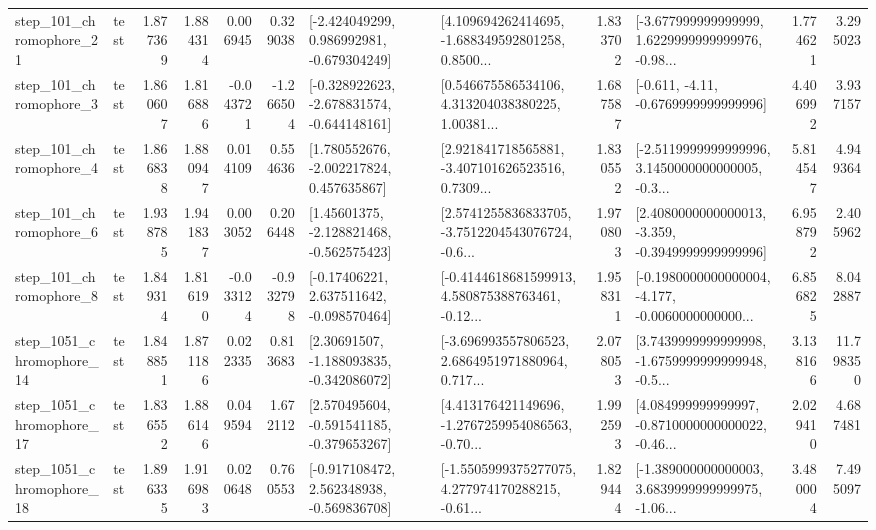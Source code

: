 \begin{tabular}{llrrrrllrlrr}
  step\_101\_chromophore\_21 &      test &      1.877369 &    1.884314 &      0.006945 &  0.329038 &   [-2.424049299, 0.986992981, -0.679304249] &  [4.109694262414695, -1.688349592801258, 0.8500... &       1.833702 &  [-3.677999999999999, 1.6229999999999976, -0.98... &            1.774621 &          3.295023 \\
   step\_101\_chromophore\_3 &      test &      1.860607 &    1.816886 &     -0.043721 & -1.266504 &  [-0.328922623, -2.678831574, -0.644148161] &  [0.546675586534106, 4.313204038380225, 1.00381... &       1.687587 &               [-0.611, -4.11, -0.6769999999999996] &            4.406992 &          3.937157 \\
   step\_101\_chromophore\_4 &      test &      1.866838 &    1.880947 &      0.014109 &  0.554636 &    [1.780552676, -2.002217824, 0.457635867] &  [2.921841718565881, -3.407101626523516, 0.7309... &       1.830552 &  [-2.5119999999999996, 3.1450000000000005, -0.3... &            5.814547 &          4.949364 \\
   step\_101\_chromophore\_6 &      test &      1.938785 &    1.941837 &      0.003052 &  0.206448 &    [1.45601375, -2.128821468, -0.562575423] &  [2.5741255836833705, -3.7512204543076724, -0.6... &       1.970803 &  [2.4080000000000013, -3.359, -0.3949999999999996] &            6.958792 &          2.405962 \\
   step\_101\_chromophore\_8 &      test &      1.849314 &    1.816190 &     -0.033124 & -0.932798 &    [-0.17406221, 2.637511642, -0.098570464] &  [-0.4144618681599913, 4.580875388763461, -0.12... &       1.958311 &  [-0.1980000000000004, -4.177, -0.0060000000000... &            6.856825 &          8.042887 \\
 step\_1051\_chromophore\_14 &      test &      1.848851 &    1.871186 &      0.022335 &  0.813683 &    [2.30691507, -1.188093835, -0.342086072] &  [-3.696993557806523, 2.6864951971880964, 0.717... &       2.078053 &  [3.7439999999999998, -1.6759999999999948, -0.5... &            3.138166 &         11.798350 \\
 step\_1051\_chromophore\_17 &      test &      1.836552 &    1.886146 &      0.049594 &  1.672112 &   [2.570495604, -0.591541185, -0.379653267] &  [4.413176421149696, -1.2767259954086563, -0.70... &       1.992593 &  [4.084999999999997, -0.8710000000000022, -0.46... &            2.029410 &          4.687481 \\
 step\_1051\_chromophore\_18 &      test &      1.896335 &    1.916983 &      0.020648 &  0.760553 &   [-0.917108472, 2.562348938, -0.569836708] &  [-1.5505999375277075, 4.277974170288215, -0.61... &       1.829444 &  [-1.389000000000003, 3.6839999999999975, -1.06... &            3.480004 &          7.495097 \\

\end{tabular}
